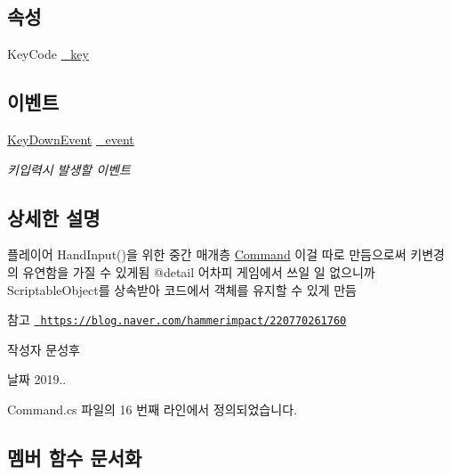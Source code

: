 \subsection*{속성}
\begin{DoxyCompactItemize}
\item 
Key\+Code \mbox{\hyperlink{class_command_a85e9adc5f9994f8da6b21bbad6dfb13d}{\+\_\+key}}
\end{DoxyCompactItemize}
\subsection*{이벤트}
\begin{DoxyCompactItemize}
\item 
\mbox{\hyperlink{class_command_acc714b5e0de57b7f24b2619fff860b9d}{Key\+Down\+Event}} \mbox{\hyperlink{class_command_a04f1a7e0dc8e999e0fca2aa9210f73a3}{\+\_\+event}}
\begin{DoxyCompactList}\small\item\em 키입력시 발생할 이벤트 \end{DoxyCompactList}\end{DoxyCompactItemize}


\subsection{상세한 설명}
플레이어 Hand\+Input()을 위한 중간 매개층 \mbox{\hyperlink{class_command}{Command}} 이걸 따로 만듬으로써 키변경의 유연함을 가질 수 있게됨 @detail 어차피 게임에서 쓰일 일 없으니까 Scriptable\+Object를 상속받아 코드에서 객체를 유지할 수 있게 만듬 

\begin{DoxySeeAlso}{참고}
\href{https://blog.naver.com/hammerimpact/220770261760}{\texttt{ https\+://blog.\+naver.\+com/hammerimpact/220770261760}} 
\end{DoxySeeAlso}
\begin{DoxyAuthor}{작성자}
문성후 
\end{DoxyAuthor}
\begin{DoxyDate}{날짜}
2019.. 
\end{DoxyDate}


Command.\+cs 파일의 16 번째 라인에서 정의되었습니다.



\subsection{멤버 함수 문서화}
\mbox{\label{class_command_a1f9dcd759b1d51871f8a6efd30c3a721}} 
